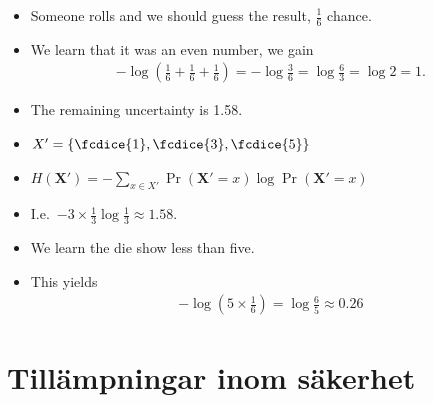 \documentclass{beamer}
\let\stoch\mathbf{}
\begin{document}
\begin{frame}
  \begin{example}
    \begin{itemize}
      \item Someone rolls and we should guess the result, \(\frac{1}{6}\) 
        chance.
      \item We learn that it was an even number, we gain
        \begin{align*}
          -\log\left( \frac{1}{6} + \frac{1}{6} + \frac{1}{6}\right) =
          -\log\frac{3}{6} = \log\frac{6}{3} = \log 2 = 1.
        \end{align*}
      \item The remaining uncertainty is \SI{1.58}{\bit}.
    \end{itemize}
  \end{example}

  \pause{}

  \begin{remark}
    \begin{itemize}
      \item \(X' = \{\fcdice{1}, \fcdice{3}, \fcdice{5}\}\)
      \item \(H(\stoch X') = - \sum_{x\in X'} \Pr(\stoch X' = x)\log \Pr(\stoch 
          X' = x)\)
      \item I.e.\ \(- 3 \times \frac{1}{3}\log\frac{1}{3} \approx 1.58\).
    \end{itemize}
  \end{remark}
\end{frame}

\begin{frame}
  \begin{example}
    \begin{itemize}
      \item We learn the die show less than five.
      \item This yields
        \begin{align*}
          -\log\left( 5\times\frac{1}{6}\right) = \log\frac{6}{5}\approx 0.26
        \end{align*}
    \end{itemize}
  \end{example}
\end{frame}


\section[Tillämpningar]{Tillämpningar inom säkerhet}
\end{document}
